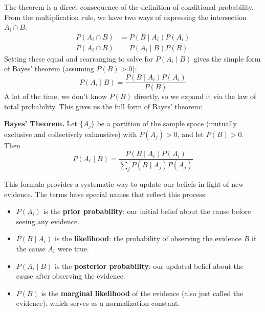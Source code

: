 The theorem is a direct consequence of the definition of conditional probability. From the multiplication rule, we have two ways of expressing the intersection $A_i \cap B$:
\begin{align*}
    P(A_i \cap B) &= P(B \mid A_i)P(A_i) \\
    P(A_i \cap B) &= P(A_i\mid B)P(B)
\end{align*}
Setting these equal and rearranging to solve for $P(A_i \mid B)$ gives the simple form of Bayes' theorem (assuming $P(B)>0$):
\begin{equation}
    P(A_i \mid B) = \frac{P(B \mid A_i)P(A_i)}{P(B)}
    \label{eq:bayes-simple}
\end{equation}
A lot of the time, we don't know $P(B)$ directly, so we expand it via the law of total probability. This gives us the full form of Bayes' theorem:
\begin{definitionBox}
    \textbf{Bayes' Theorem.} Let $\{A_j\}$ be a partition of the sample space (mutually exclusive and collectively exhaustive) with $P(A_j)>0$, and let $P(B)>0$. Then
    \begin{equation}
        P(A_i \mid B) = \frac{P(B \mid A_i)P(A_i)}{\sum_{j} P(B \mid A_j)P(A_j)}
        \label{eq:bayes-full}
    \end{equation}
\end{definitionBox}
This formula provides a systematic way to update our beliefs in light of new evidence. The terms have special names that reflect this process:
\begin{itemize}
    \item $P(A_i)$ is the \textbf{prior probability}: our initial belief about the cause before seeing any evidence.
    \item $P(B \mid A_i)$ is the \textbf{likelihood}: the probability of observing the evidence $B$ if the cause $A_i$ were true.
    \item $P(A_i \mid B)$ is the \textbf{posterior probability}: our updated belief about the cause after observing the evidence.
    \item $P(B)$ is the \textbf{marginal likelihood} of the evidence (also just called the evidence), which serves as a normalization constant.
\end{itemize}

